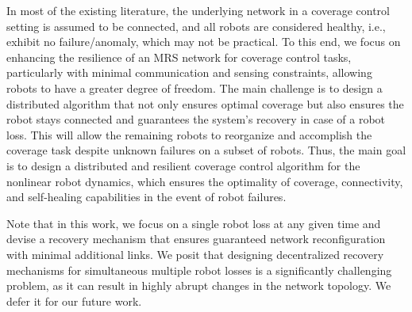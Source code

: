 
In most of the existing literature, the underlying network in a coverage control setting is assumed to be connected, and all robots are considered healthy, i.e., exhibit no failure/anomaly, which may not be practical. To this end, we focus on enhancing the resilience of an MRS network for coverage control tasks, particularly with minimal communication and sensing constraints, allowing robots to have a greater degree of freedom. The main challenge is to design a distributed algorithm that not only ensures optimal coverage but also ensures the robot stays connected and guarantees the system's recovery in case of a robot loss. This will allow the remaining robots to reorganize and accomplish the coverage task despite unknown failures on a subset of robots. Thus, the main goal is to design a distributed and resilient coverage control algorithm for the nonlinear robot dynamics, which ensures the optimality of coverage, connectivity, and self-healing capabilities in the event of robot failures. 
\begin{remark}
Note that in this work, we focus on a single robot loss at any given time and devise a recovery mechanism that ensures guaranteed network reconfiguration with minimal additional links. We posit that designing decentralized recovery mechanisms for simultaneous multiple robot losses is a significantly challenging problem, as it can result in highly abrupt changes in the network topology. We defer it for our future work.
\end{remark}
